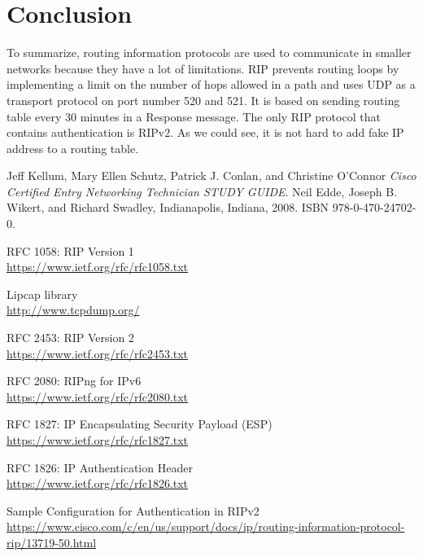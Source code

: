 \documentclass[11pt,a4paper]{article}
\begin{document}
\section{Conclusion}
To summarize, routing information protocols are used to communicate in smaller networks because they have a lot of limitations. RIP prevents routing loops by implementing a limit on the number of hops allowed in a path and uses UDP as a transport protocol on port number 520 and 521. It is based on sending routing table every 30 minutes in a Response message. The only RIP protocol that contains authentication is RIPv2. As we could see, it is not hard to add fake IP address to a routing table.  


\pagebreak

\begin{thebibliography}{9}
Jeff Kellum, Mary Ellen Schutz, Patrick J. Conlan, and Christine O'Connor
\textit{Cisco Certified Entry Networking Technician STUDY GUIDE}.  
Neil Edde, Joseph B. Wikert, and Richard Swadley, Indianapolis, Indiana, 2008. ISBN 978-0-470-24702-0.
 
RFC 1058:  RIP Version 1
\\\url{https://www.ietf.org/rfc/rfc1058.txt}

Lipcap library
\\\url{http://www.tcpdump.org/}

RFC 2453:  RIP Version 2
\\\url{https://www.ietf.org/rfc/rfc2453.txt}
 
RFC 2080:  RIPng for IPv6
\\\url{https://www.ietf.org/rfc/rfc2080.txt}

RFC 1827: IP Encapsulating Security Payload (ESP)
\\\url{https://www.ietf.org/rfc/rfc1827.txt}

RFC 1826: IP Authentication Header
\\\url{https://www.ietf.org/rfc/rfc1826.txt}

Sample Configuration for Authentication in RIPv2
\\\url{https://www.cisco.com/c/en/us/support/docs/ip/routing-information-protocol-rip/13719-50.html}

\end{thebibliography}
\end{document}
